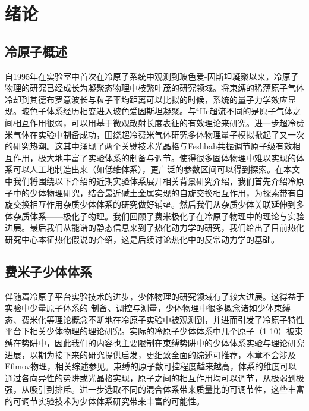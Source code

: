 \chapter{绪论}\label{chap:kondo}



\section{冷原子概述}

自1995年在实验室中首次在冷原子系统中观测到玻色爱-因斯坦凝聚\cite{anderson1995observation,davis1995bose,Bradley1995evidence}以来，冷原子物理的研究已经成长为凝聚态物理中枝繁叶茂的研究领域。将束缚的稀薄原子气体冷却到其德布罗意波长与粒子平均距离可以比拟的时候，系统的量子力学效应显现。玻色子体系经历相变进入玻色爱因斯坦凝聚。与${}^4$He超流不同的是原子气体之间相互作用很弱，可以用基于微观散射长度表征的有效理论来研究\cite{Dalfovo1999theory,Fetter2009rotating,pethick2008bose,pitaevskii2003bose}。进一步超冷费米气体在实验中制备成功，围绕超冷费米气体研究多体物理量子模拟掀起了又一次的研究热潮\cite{Giorgini2008theory}。这其中涌现了两个关键技术光晶格\cite{Bloch2008many}与Feshbah共振调节原子级有效相互作用\cite{Chin2010feshbach}，极大地丰富了实验体系的制备与调节。使得很多固体物理中难以实现的体系可以人工地制造出来（如低维体系\cite{Cazalilla2011one,Guan2013fermi}），更广泛的参数区间可以得到探索。在本文中我们将围绕以下介绍的近期实验体系展开相关背景研究介绍，我们首先介绍冷原子中的少体物理研究，结合最近碱土金属实现的自旋交换相互作用，为探索带有自旋交换相互作用杂质少体体系的研究做好铺垫。然后我们从杂质少体关联延伸到多体杂质体系——极化子物理。我们回顾了费米极化子在冷原子物理中的理论与实验进展。最后我们从能谱的静态信息来到了热化动力学的研究，我们给出了目前热化研究中心本征热化假说的介绍，这是后续讨论热化中的反常动力学的基础。


\section{费米子少体体系}\label{sec:fewbody}
伴随着冷原子平台实验技术的进步，少体物理的研究领域有了较大进展。这得益于实验中少量原子体系的
制备、调控与测量，少体物理中很多概念诸如少体束缚态、费米化等理论概念不断地在冷原子实验中被观测到，并进而引发了冷原子特性平台下相关少体物理的理论研究。实际的冷原子少体体系中几个原子（1-10）被束缚在势阱中，因此我们的内容也主要限制在束缚势阱中的少体体系实验与理论研究进展，以期为接下来的研究提供启发，更细致全面的综述可推荐\cite{sowinski2019one,blume2012few}，本章不会涉及Efimov物理，相关综述参见\cite{nielsen2001three,braaten2006universality,KohlerMolFRRMP}。束缚的原子数可控程度越来越高，体系的维度可以通过各向异性的势阱或光晶格实现，原子之间的相互作用均可以调节，从极弱到极强，从吸引到排斥。进一步选取不同的混合体系带来质量比的可调节性，这些丰富的可调节实验技术为少体体系研究带来丰富的可能性。

